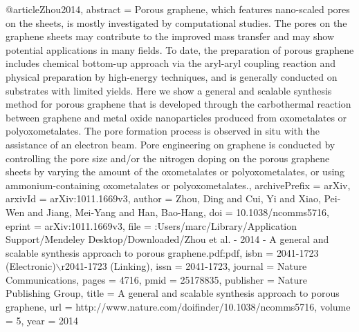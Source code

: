 @article{Zhou2014,
abstract = {Porous graphene, which features nano-scaled pores on the sheets, is mostly investigated by computational studies. The pores on the graphene sheets may contribute to the improved mass transfer and may show potential applications in many fields. To date, the preparation of porous graphene includes chemical bottom-up approach via the aryl-aryl coupling reaction and physical preparation by high-energy techniques, and is generally conducted on substrates with limited yields. Here we show a general and scalable synthesis method for porous graphene that is developed through the carbothermal reaction between graphene and metal oxide nanoparticles produced from oxometalates or polyoxometalates. The pore formation process is observed in situ with the assistance of an electron beam. Pore engineering on graphene is conducted by controlling the pore size and/or the nitrogen doping on the porous graphene sheets by varying the amount of the oxometalates or polyoxometalates, or using ammonium-containing oxometalates or polyoxometalates.},
archivePrefix = {arXiv},
arxivId = {arXiv:1011.1669v3},
author = {Zhou, Ding and Cui, Yi and Xiao, Pei-Wen and Jiang, Mei-Yang and Han, Bao-Hang},
doi = {10.1038/ncomms5716},
eprint = {arXiv:1011.1669v3},
file = {:Users/marc/Library/Application Support/Mendeley Desktop/Downloaded/Zhou et al. - 2014 - A general and scalable synthesis approach to porous graphene.pdf:pdf},
isbn = {2041-1723 (Electronic)$\backslash$r2041-1723 (Linking)},
issn = {2041-1723},
journal = {Nature Communications},
pages = {4716},
pmid = {25178835},
publisher = {Nature Publishing Group},
title = {{A general and scalable synthesis approach to porous graphene}},
url = {http://www.nature.com/doifinder/10.1038/ncomms5716},
volume = {5},
year = {2014}
}
